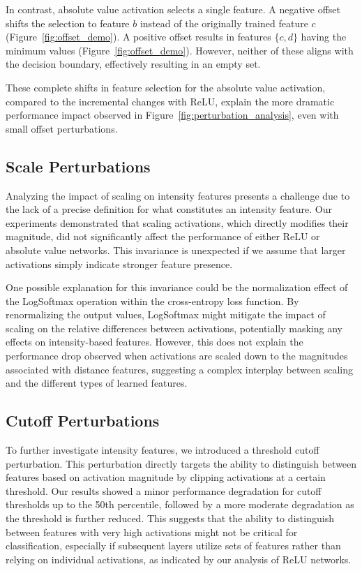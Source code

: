 In contrast, absolute value activation selects a single feature. A negative offset shifts the selection to feature $b$ instead of the originally trained feature $c$ (Figure~\ref{fig:offset_demo}). A positive offset results in features $\{c, d\}$ having the minimum values (Figure~\ref{fig:offset_demo}). However, neither of these aligns with the decision boundary, effectively resulting in an empty set.

These complete shifts in feature selection for the absolute value activation, compared to the incremental changes with ReLU, explain the more dramatic performance impact observed in Figure~\ref{fig:perturbation_analysis}, even with small offset perturbations.

\subsection{Scale Perturbations}

Analyzing the impact of scaling on intensity features presents a challenge due to the lack of a precise definition for what constitutes an intensity feature. Our experiments demonstrated that scaling activations, which directly modifies their magnitude, did not significantly affect the performance of either ReLU or absolute value networks. This invariance is unexpected if we assume that larger activations simply indicate stronger feature presence.

One possible explanation for this invariance could be the normalization effect of the LogSoftmax operation within the cross-entropy loss function. By renormalizing the output values, LogSoftmax might mitigate the impact of scaling on the relative differences between activations, potentially masking any effects on intensity-based features. However, this does not explain the performance drop observed when activations are scaled down to the magnitudes associated with distance features, suggesting a complex interplay between scaling and the different types of learned features.

\subsection{Cutoff Perturbations}

To further investigate intensity features, we introduced a threshold cutoff perturbation. This perturbation directly targets the ability to distinguish between features based on activation magnitude by clipping activations at a certain threshold. Our results showed a minor performance degradation for cutoff thresholds up to the 50th percentile, followed by a more moderate degradation as the threshold is further reduced. This suggests that the ability to distinguish between features with very high activations might not be critical for classification, especially if subsequent layers utilize sets of features rather than relying on individual activations, as indicated by our analysis of ReLU networks.

